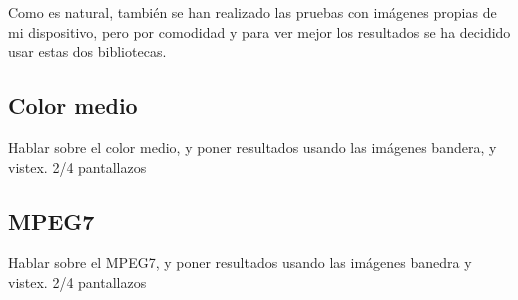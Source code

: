 Como es natural, también se han realizado las pruebas con imágenes propias de mi dispositivo, pero por comodidad y para ver mejor los resultados se ha decidido usar estas dos bibliotecas.


\subsection{Color medio}

Hablar sobre el color medio, y poner resultados usando las imágenes bandera, y vistex. 2/4 pantallazos


\subsection{MPEG7}

Hablar sobre el MPEG7, y poner resultados usando las imágenes banedra y vistex. 2/4 pantallazos





